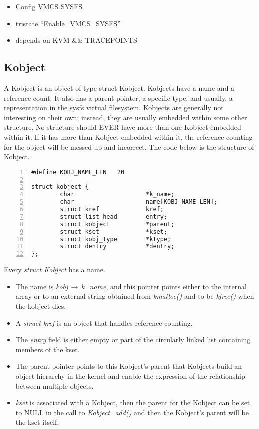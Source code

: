 \documentclass[10pt,draftclsnofoot,journal,compsoc,onecolumn]{IEEEtran}
\begin{document}
\begin{itemize}
\item Config VMCS SYSFS
\item tristate “Enable\_VMCS\_SYSFS”
\item depends on KVM \&\& TRACEPOINTS
\end{itemize}

\subsection{Kobject}
\par A Kobject is an object of type struct Kobject.  Kobjects have a name and a reference count. It also has a parent pointer, a specific type, and usually, a representation in the sysfs virtual filesystem.
Kobjects are generally not interesting on their own; instead, they are usually embedded within some other structure.
No structure should EVER have more than one Kobject embedded within it.
If it has more than Kobject embedded within it, the reference counting for the object will be messed up and incorrect.
The code below is the structure of Kobject.

\begin{lstlisting}[numbers=left]
#define KOBJ_NAME_LEN   20

struct kobject {
        char                    *k_name;
        char                    name[KOBJ_NAME_LEN];
        struct kref             kref;
        struct list_head        entry;
        struct kobject          *parent;
        struct kset             *kset;
        struct kobj_type        *ktype;
        struct dentry           *dentry;
};

\end{lstlisting}

Every \textit{struct Kobject} has a name.
\begin{itemize}

\item The name is \textit{kobj$\,\to\,$k\_name}, and this pointer points either to the internal array or to an external string obtained from \textit{kmalloc()} and to be \textit{kfree()} when the kobject dies.

\item A \textit{struct kref} is an object that handles reference counting.

\item The \textit{entry} field is either empty or part of the circularly linked list containing members of the kset.

\item The parent pointer points to this Kobject’s parent that Kobjects build an object hierarchy in the kernel and
enable the expression of the relationship between multiple objects. 

\item \textit{kset} is associated with a Kobject, then the parent for the Kobject can be set to NULL in the call to \textit{Kobject\_add()} and then the Kobject's parent will be the kset itself.

\end{itemize}
\end{document}
